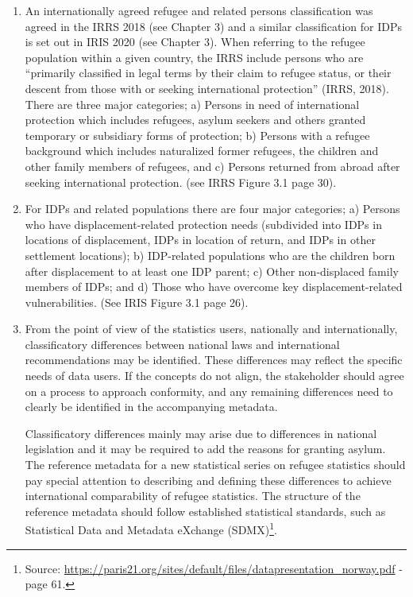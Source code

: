 \documentclass[
]{article}
\begin{document}
\begin{enumerate}
\def\labelenumi{\arabic{enumi}.}
\setcounter{enumi}{49}
\item
  An internationally agreed refugee and related persons classification
  was agreed in the IRRS 2018 (see Chapter 3) and a similar
  classification for IDPs is set out in IRIS 2020 (see Chapter 3).
  When referring to the refugee population within a given country, the
  IRRS include persons who are ``primarily classified in legal terms by
  their claim to refugee status, or their descent from those with or
  seeking international protection'' (IRRS, 2018). There are three
  major categories; a) Persons in need of international protection
  which includes refugees, asylum seekers and others granted temporary
  or subsidiary forms of protection; b) Persons with a refugee
  background which includes naturalized former refugees, the children
  and other family members of refugees, and c) Persons returned from
  abroad after seeking international protection. (see IRRS Figure 3.1
  page 30).
\item
  For IDPs and related populations there are four major categories; a)
  Persons who have displacement-related protection needs (subdivided
  into IDPs in locations of displacement, IDPs in location of return,
  and IDPs in other settlement locations); b) IDP-related populations
  who are the children born after displacement to at least one IDP
  parent; c) Other non-displaced family members of IDPs; and d) Those
  who have overcome key displacement-related vulnerabilities. (See
  IRIS Figure 3.1 page 26).
\item
  From the point of view of the statistics users, nationally and
  internationally, classificatory differences between national laws
  and international recommendations may be identified. These
  differences may reflect the specific needs of data users. If the
  concepts do not align, the stakeholder should agree on a process to
  approach conformity, and any remaining differences need to clearly
  be identified in the accompanying metadata.

  Classificatory differences mainly may arise due to differences in
  national legislation and it may be required to add the reasons for
  granting asylum. The reference metadata for a new statistical series
  on refugee statistics should pay special attention to describing and
  defining these differences to achieve international comparability of
  refugee statistics. The structure of the reference metadata should
  follow established statistical standards, such as Statistical Data
  and Metadata eXchange (SDMX)\footnote{Source:
    \url{https://paris21.org/sites/default/files/datapresentation_norway.pdf}
    - page 61.}.
\end{enumerate}
\end{document}
